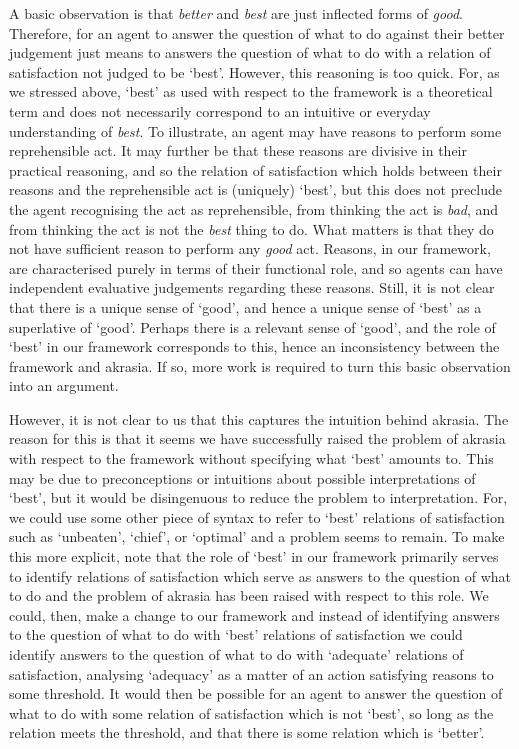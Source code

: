 \documentclass[10pt]{article}
\begin{document}
A basic observation is that \emph{better} and \emph{best} are just inflected forms of \emph{good}.
Therefore, for an agent to answer the question of what to do against their better judgement just means to answers the question of what to do with a relation of satisfaction  not judged to be `best'.
However, this reasoning is too quick.
For, as we stressed above, `best' as used with respect to the framework is a theoretical term and does not necessarily correspond to an intuitive or everyday understanding of \emph{best}.
To illustrate, an agent may have reasons to perform some reprehensible act.
It may further be that these reasons are divisive in their practical reasoning, and so the relation of satisfaction which holds between their reasons and the reprehensible act is (uniquely) `best', but this does not preclude the agent recognising the act as reprehensible, from thinking the act is \emph{bad}, and from thinking the act is not the \emph{best} thing to do.
What matters is that they do not have sufficient reason to perform any \emph{good} act.
Reasons, in our framework, are characterised purely in terms of their functional role, and so agents can have independent evaluative judgements regarding these reasons.
Still, it is not clear that there is a unique sense of `good', and hence a unique sense of `best' as a superlative of `good'.
Perhaps there is a relevant sense of `good', and the role of `best' in our framework corresponds to this, hence an inconsistency between the framework and akrasia.
If so, more work is required to turn this basic observation into an argument.

However, it is not clear to us that this captures the intuition behind akrasia.
The reason for this is that it seems we have successfully raised the problem of akrasia with respect to the framework without specifying what `best' amounts to.
This may be due to preconceptions or intuitions about possible interpretations of `best', but it would be disingenuous to reduce the problem to interpretation.
For, we could use some other piece of syntax to refer to `best' relations of satisfaction such as `unbeaten', `chief', or `optimal' and a problem seems to remain.
To make this more explicit, note that the role of `best' in our framework primarily serves to identify relations of satisfaction which serve as answers to the question of what to do and the problem of akrasia has been raised with respect to this role.
We could, then, make a change to our framework and instead of identifying answers to the question of what to do with `best' relations of satisfaction we could identify answers to the question of what to do with `adequate' relations of satisfaction, analysing `adequacy' as a matter of an action satisfying reasons to some threshold.
It would then be possible for an agent to answer the question of what to do with some relation of satisfaction which is not `best', so long as the relation meets the threshold, and that there is some relation which is `better'.
\end{document}
